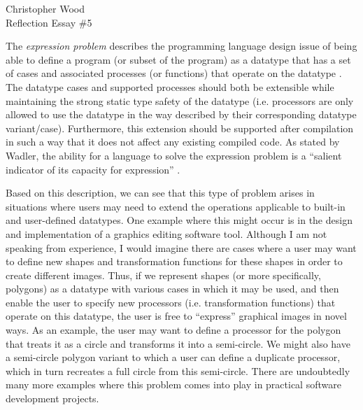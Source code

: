 \documentclass[12pt,letterpaper]{article}
\begin{document}
\begin{center}
Christopher Wood \\
Reflection Essay \#5 \\
\end{center}

\begin{comment}
What is the "expression problem"?
Can you suggest a realistic example of where one might encounter the expression problem is a software development project?
Is this a good "programming-languages problem"? That is, do you think that a programming language that has a "good" solution to the expression problem is "better" than a programming language that has a "bad" solution or no solution?
Can you suggest another "programming-languages problem"? That is, can you suggest a programming or software development task that you think would allow you to identify "good" (e.g., "powerful") languages from "bad" (e.g., "weak") languages.
\end{comment}

The \emph{expression problem} describes the programming language design issue of 
being able to define a program (or subset of the program) 
as a datatype that has a set of cases and associated processes (or functions) 
that operate on the datatype \cite{zenger2004independently}.
The datatype cases and supported processes should both be extensible while maintaining the strong
static type safety of the datatype (i.e. processors are only allowed to use the datatype in the way
described by their corresponding datatype variant/case). Furthermore, this extension should be 
supported after compilation in such a way that it does not affect any existing compiled code. 
As stated by Wadler, the ability for a language to solve the expression problem is a ``salient
indicator of its capacity for expression'' \cite{wadler1998expression}. 

Based on this description, we can see that this type of problem arises in  
situations where users may need to extend the operations applicable to built-in 
and user-defined datatypes. One example where this might occur is in the design and implementation of a graphics 
editing software tool. Although I am not speaking from experience, I would imagine there are cases where
a user may want to define new shapes and transformation functions for these shapes in order to create
different images. Thus, if we represent shapes (or more specifically, polygons) as a datatype 
with various cases in which it may be used, and then enable the user to specify new processors (i.e.
transformation functions) that operate on this datatype, the user is free to ``express'' graphical
images in novel ways. As an example, the user may want to define a processor for the polygon
that treats it as a circle and transforms it into a semi-circle. We might also
have a semi-circle polygon variant to which a user can define a duplicate processor, which
in turn recreates a full circle from this semi-circle. 
There are undoubtedly many more examples where this problem comes into play in practical
software development projects.
\end{document}
